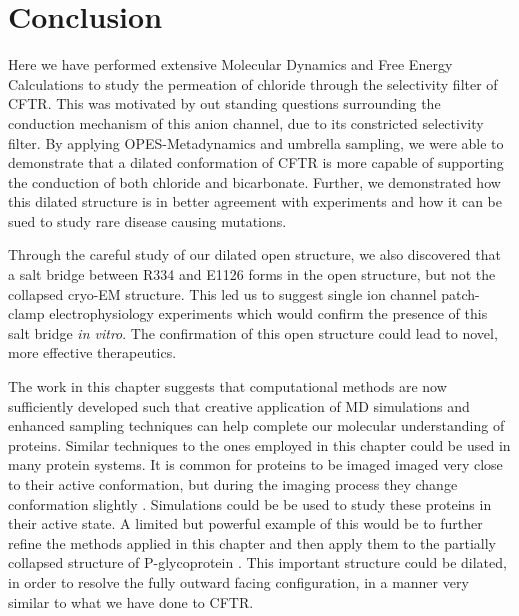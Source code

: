 
\section{Conclusion}
Here we have performed extensive Molecular Dynamics and Free Energy Calculations to study the permeation of chloride through the selectivity filter of CFTR. This was motivated by out standing questions surrounding the conduction mechanism of this anion channel, due to its constricted selectivity filter. By applying OPES-Metadynamics and umbrella sampling, we were able to demonstrate that a dilated conformation of CFTR is more capable of supporting the conduction of both chloride and bicarbonate. Further, we demonstrated how this dilated structure is in better agreement with experiments and how it can be sued to study rare disease causing mutations.

Through the careful study of our dilated open structure, we also discovered that a salt bridge between R334 and E1126 forms in the open structure, but not the collapsed cryo-EM structure. This led us to suggest single ion channel patch-clamp electrophysiology experiments which would confirm the presence of this salt bridge \textit{in vitro}. The confirmation of this open structure could lead to novel, more effective therapeutics.

The work in this chapter suggests that computational methods are now sufficiently developed such that creative application of MD simulations and enhanced sampling techniques can help complete our molecular understanding of proteins. Similar techniques to the ones employed in this chapter could be used in many protein systems. It is common for proteins to be imaged imaged very close to their active conformation, but during the imaging process they change conformation slightly \cite{bock2022}. Simulations could be be used to study these proteins in their active state. A limited but powerful example of this would be to further refine the methods applied in this chapter and then apply them to the partially collapsed structure of P-glycoprotein \cite{kim2018a}. This important structure could be dilated, in order to resolve the fully outward facing configuration, in a manner very similar to what we have done to CFTR.



